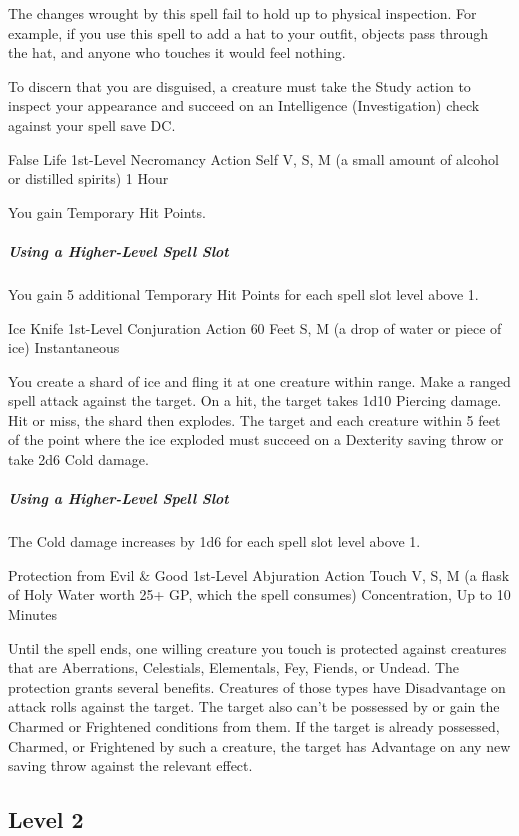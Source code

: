 \documentclass[letterpaper,openany,oneside,twocolumn]{book}
\begin{document}
The changes wrought by this spell fail to hold up to physical inspection. For example, if you use this spell to add a hat to your outfit, objects pass through the hat, and anyone who touches it would feel nothing.

To discern that you are disguised, a creature must take the Study action to inspect your appearance and succeed on an Intelligence (Investigation) check against your spell save DC.

\DndSpellHeader
  {False Life}
  {1st-Level Necromancy}
  {Action}
  {Self}
  {V, S, M (a small amount of alcohol or distilled spirits)}
  {1 Hour}

You gain  Temporary Hit Points.

\subparagraph*{Using a Higher-Level Spell Slot} You gain 5 additional Temporary Hit Points for each spell slot level above 1.

\DndSpellHeader
  {Ice Knife}
  {1st-Level Conjuration}
  {Action}
  {60 Feet}
  {S, M (a drop of water or piece of ice)}
  {Instantaneous}

You create a shard of ice and fling it at one creature within range. Make a ranged spell attack against the target. On a hit, the target takes 1d10 Piercing damage. Hit or miss, the shard then explodes. The target and each creature within 5 feet of the point where the ice exploded must succeed on a Dexterity saving throw or take 2d6 Cold damage.

\subparagraph*{Using a Higher-Level Spell Slot} The Cold damage increases by 1d6 for each spell slot level above 1.

\DndSpellHeader
  {Protection from Evil \& Good}
  {1st-Level Abjuration}
  {Action}
  {Touch}
  {V, S, M (a flask of Holy Water worth 25+ GP, which the spell consumes)}
  {Concentration, Up to 10 Minutes}

Until the spell ends, one willing creature you touch is protected against creatures that are Aberrations, Celestials, Elementals, Fey, Fiends, or Undead. The protection grants several benefits. Creatures of those types have Disadvantage on attack rolls against the target. The target also can't be possessed by or gain the Charmed or Frightened conditions from them. If the target is already possessed, Charmed, or Frightened by such a creature, the target has Advantage on any new saving throw against the relevant effect.

\subsection*{Level 2}
\end{document}
